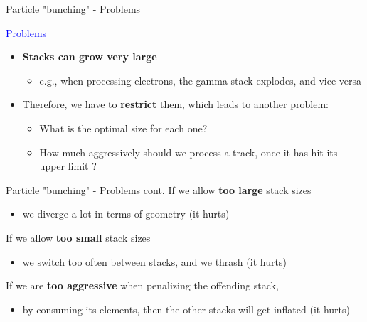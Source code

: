 \documentclass{beamer}
\begin{document}
\begin{frame}{Particle "bunching" - Problems}

\textcolor{blue}{Problems}
\begin{itemize}
\item {\bf Stacks can grow very large}
\begin{itemize}
\item e.g., when processing electrons, the gamma stack explodes, and vice versa
\end{itemize}
\item Therefore, we have to {\bf restrict} them, which leads to another problem:
\begin{itemize}
\item What is the optimal size for each one?
\item How much aggressively should we process a track, once it has hit its upper limit ?
\end{itemize}
\end{itemize}
\end{frame}

\begin{frame}{Particle "bunching" - Problems cont.}
If we allow {\bf too large} stack sizes
\begin{itemize}
\item we diverge a lot in terms of geometry (it hurts)
\end{itemize}
If we allow {\bf too small} stack sizes
\begin{itemize}
\item we switch too often between stacks, and we thrash (it hurts)
\end{itemize}
\vspace{5mm}
If we are {\bf too aggressive} when penalizing the offending stack,
\begin{itemize}
\item by consuming its elements, then the other stacks will get inflated (it hurts)
\end{itemize}

\begin{center}
\end{center}
\end{frame}
\end{document}
